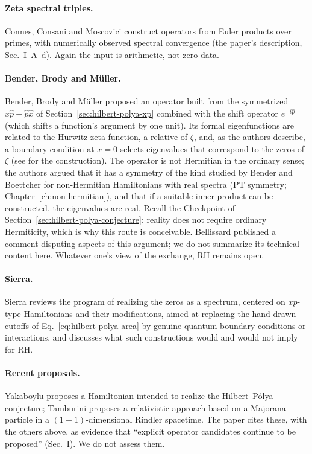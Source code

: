 \paragraph{Zeta spectral triples.} Connes, Consani and Moscovici \cite{zetatriples} construct operators from Euler products over primes, with numerically observed spectral convergence (the paper's description, Sec.~I~A~d). Again the input is arithmetic, not zero data.

\paragraph{Bender, Brody and M\"uller.} Bender, Brody and M\"uller \cite{bbm} proposed an operator built from the symmetrized $\hat x\hat p+\hat p\hat x$ of Section~\ref{sec:hilbert-polya-xp} combined with the shift operator $e^{-i\hat p}$ (which shifts a function's argument by one unit). Its formal eigenfunctions are related to the Hurwitz zeta function, a relative of $\zeta$, and, as the authors describe, a boundary condition at $x=0$ selects eigenvalues that correspond to the zeros of $\zeta$ (see \cite{bbm} for the construction). The operator is not Hermitian in the ordinary sense; the authors argued that it has a symmetry of the kind studied by Bender and Boettcher for non-Hermitian Hamiltonians with real spectra \cite{bender98} (PT symmetry; Chapter~\ref{ch:non-hermitian}), and that if a suitable inner product can be constructed, the eigenvalues are real. Recall the Checkpoint of Section~\ref{sec:hilbert-polya-conjecture}: reality does not require ordinary Hermiticity, which is why this route is conceivable. Bellissard published a comment \cite{bellissard} disputing aspects of this argument; we do not summarize its technical content here. Whatever one's view of the exchange, RH remains open.

\paragraph{Sierra.} Sierra \cite{sierra} reviews the program of realizing the zeros as a spectrum, centered on $xp$-type Hamiltonians and their modifications, aimed at replacing the hand-drawn cutoffs of Eq.~\eqref{eq:hilbert-polya-area} by genuine quantum boundary conditions or interactions, and discusses what such constructions would and would not imply for RH.

\paragraph{Recent proposals.} Yakaboylu \cite{recenthp1} proposes a Hamiltonian intended to realize the Hilbert--P\'olya conjecture; Tamburini \cite{recenthp2} proposes a relativistic approach based on a Majorana particle in a $(1{+}1)$-dimensional Rindler spacetime. The paper cites these, with the others above, as evidence that ``explicit operator candidates continue to be proposed'' (Sec.~I). We do not assess them.

